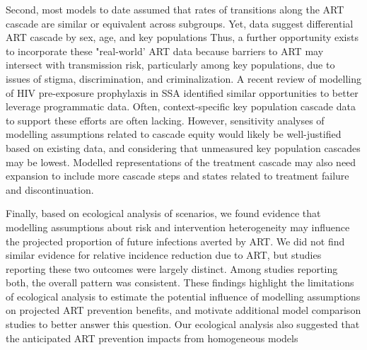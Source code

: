 \par
Second, most models to date assumed that rates of transitions along the ART cascade are
similar or equivalent across subgroups. Yet, data suggest differential ART cascade by sex, age, and key populations
\cite{Mountain2014,Lancaster2016,Green2020}
Thus, a further opportunity exists to incorporate these "real-world' ART data because barriers to ART may intersect with transmission risk,
particularly among key populations, due to issues of stigma, discrimination, and criminalization.  %
\cite{Ortblad2019,Baral2019}
A recent review of modelling of HIV pre-exposure prophylaxis in SSA\cite{Case2019} %
identified similar opportunities to better leverage programmatic data.
Often, context-specific key population cascade data to support these efforts are often lacking.\cite{Mountain2014}  %
However, sensitivity analyses of modelling assumptions related to cascade equity
would likely be well-justified based on existing data,\cite{Mountain2014,Green2020}
and considering that unmeasured key population cascades may be lowest.\cite{Roberts2020}
Modelled representations of the treatment cascade may also need expansion
to include more cascade steps and states related to treatment failure and discontinuation.
\par
Finally, based on ecological analysis of scenarios, we found evidence that
modelling assumptions about risk and intervention heterogeneity
may influence the projected proportion of future infections averted by ART.
We did not find similar evidence for relative incidence reduction due to ART,
but studies reporting these two outcomes were largely distinct.
Among studies reporting both, the overall pattern was consistent.
These findings highlight the limitations of ecological analysis to estimate
the potential influence of modelling assumptions on projected ART prevention benefits,
and motivate additional model comparison studies to better answer this question.
Our ecological analysis also suggested that the anticipated ART prevention impacts from homogeneous models
